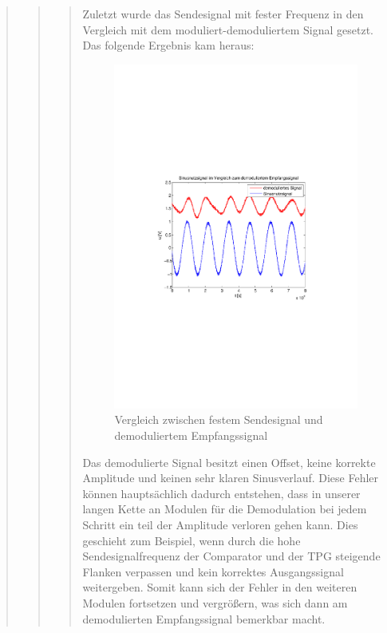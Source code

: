 \begin{quote}
\begin{quote}
\begin{quote}
          Zuletzt wurde das Sendesignal mit fester Frequenz in den Vergleich mit
          dem moduliert-demoduliertem Signal gesetzt. Das folgende Ergebnis kam
          heraus:
          
           
             \begin{figure}[H] \centering
                    \includegraphics[scale=0.5, trim = 4cm 9cm 3.5cm 9.5cm,
                    clip]{./Bilder/sinus_fm_demod}
                        \caption{Vergleich zwischen festem Sendesignal und
                        demoduliertem Empfangssignal}
                \end{figure}
          
        Das demodulierte Signal besitzt einen Offset, keine korrekte Amplitude 
        und keinen sehr klaren Sinusverlauf. Diese Fehler können hauptsächlich
        dadurch entstehen, dass in unserer langen Kette an Modulen für die
        Demodulation bei jedem Schritt ein teil der Amplitude verloren gehen
        kann. Dies geschieht zum Beispiel, wenn durch die hohe
        Sendesignalfrequenz der Comparator und der TPG steigende Flanken
        verpassen und kein korrektes Ausgangssignal weitergeben. Somit kann sich
        der Fehler in den weiteren Modulen fortsetzen und vergrößern, was sich
        dann am demodulierten Empfangssignal bemerkbar macht.\\
               

\end{quote}
\end{quote}
\end{quote}

